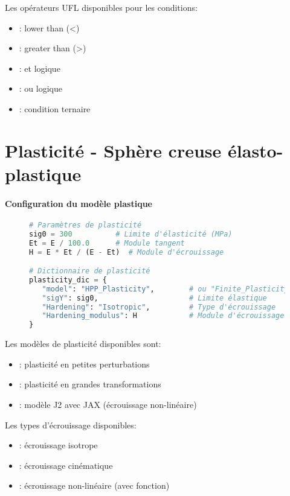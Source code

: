 \documentclass[10pt]{book}
\begin{document}
Les opérateurs UFL disponibles pour les conditions:
\begin{itemize}
\item {}: lower than (<)
\item {}: greater than (>)
\item {}: et logique
\item {}: ou logique
\item {}: condition ternaire
\end{itemize}

\clearpage

\section{Plasticité - Sphère creuse élasto-plastique}\label{Section:Plasticité - Sphère creuse élasto-plastique}

\paragraph{Configuration du modèle plastique}

\begin{figure}[h!]
\begin{lstlisting}[language=python]
# Paramètres de plasticité
sig0 = 300          # Limite d'élasticité (MPa)
Et = E / 100.0      # Module tangent
H = E * Et / (E - Et)  # Module d'écrouissage

# Dictionnaire de plasticité
plasticity_dic = {
   "model": "HPP_Plasticity",        # ou "Finite_Plasticity"
   "sigY": sig0,                     # Limite élastique
   "Hardening": "Isotropic",         # Type d'écrouissage
   "Hardening_modulus": H            # Module d'écrouissage
}
\end{lstlisting}
\end{figure}

Les modèles de plasticité disponibles sont:
\begin{itemize}
\item {}: plasticité en petites perturbations
\item {}: plasticité en grandes transformations
\item {}: modèle J2 avec JAX (écrouissage non-linéaire)
\end{itemize}

Les types d'écrouissage disponibles:
\begin{itemize}
\item {}: écrouissage isotrope
\item {}: écrouissage cinématique
\item {}: écrouissage non-linéaire (avec fonction)
\end{itemize}
\end{document}
